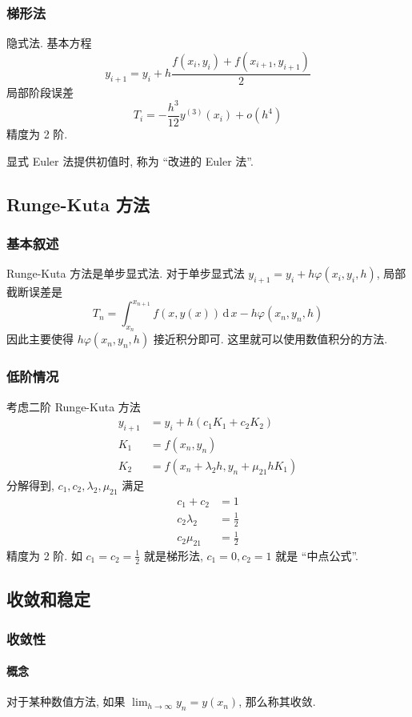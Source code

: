 \documentclass{ctexart}
\newcommand{\ud}{\,\mathrm{d}\,}
\begin{document}
\subsubsection{梯形法}
    隐式法. 基本方程\[
        y_{i+1} = y_i + h \frac{f(x_i, y_i) + f(x_{i+1}, y_{i+1})}{2}\]
    局部阶段误差 \[
        T_i = -\frac{h^3}{12} y^{(3)}(x_i) + o(h^4)\]
    精度为 2 阶.\par
    显式 Euler 法提供初值时, 称为 ``改进的 Euler 法''.

\subsection{Runge-Kuta 方法}
\subsubsection{基本叙述}
    Runge-Kuta 方法是单步显式法.
    对于单步显式法 $y_{i+1} = y_i + h \varphi(x_i, y_i, h)$,
    局部截断误差是 \[
        T_n = \int_{x_n}^{x_{n+1}} f(x, y(x)) \ud x - h \varphi(x_n, y_n, h)\]
    因此主要使得 $h \varphi(x_n, y_n, h)$ 接近积分即可. 这里就可以使用数值积分的方法.
\subsubsection{低阶情况}
    考虑二阶 Runge-Kuta 方法 \begin{align*}
        y_{i+1} &= y_i + h (c_1 K_1 + c_2 K_2)\\
        K_1 &= f(x_n, y_n)\\
        K_2 &= f(x_n + \lambda_2 h, y_n + \mu_{21} h K_1)
    \end{align*}
    分解得到, $c_1, c_2, \lambda_2, \mu_{21}$ 满足 \begin{align*}
        c_1 + c_2 &= 1\\
        c_2 \lambda_2 &= \frac{1}{2}\\
        c_2 \mu_{21} &= \frac{1}{2}
    \end{align*}
    精度为 2 阶. 如 $c_1 = c_2 = \frac{1}{2}$ 就是梯形法, $c_1 = 0, c_2 = 1$ 就是 ``中点公式''.

\subsection{收敛和稳定}
\subsubsection{收敛性}
\paragraph{概念}
    对于某种数值方法, 如果 $\lim_{h \to \infty} y_n = y(x_n)$, 那么称其收敛.
\end{document}
